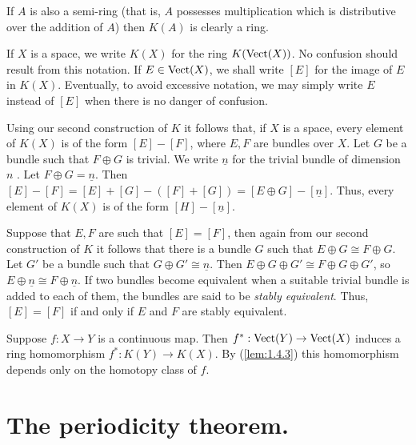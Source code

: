 If $A$ is also a semi-ring (that is, $A$ possesses multiplication which is distributive over the addition of $A$) then $K(A)$ is clearly a ring. \par \hfill

If $X$ is a space, we write $K(X)$ for the ring $K(\operatorname{Vect}(X))$. No confusion should result from this notation. If $E \in \operatorname{Vect}(X)$, we shall write $[E]$ for the image of $E$ in $K(X)$. Eventually, to avoid excessive notation, we may simply write $E$ instead of $[E]$ when there is no danger of confusion. \par 

Using our second construction of $K$ it follows that, if $X$ is a space, every element of $K(X)$ is of the form $[E] - [F]$, where $E, F$ are bundles over $X$. Let $G$ be a bundle such that $F \oplus G$ is trivial. We write $\underline{n}$ for the trivial bundle of dimension $n$ . Let $F \oplus G = \underline{n}$. Then $[E] - [F] = [E] + [G] - ([F] + [G]) = [E \oplus G] - [\underline{n}]$. Thus, every element of $K(X)$ is of the form $[H] -  [\underline{n}]$. \par 

Suppose that $E, F$ are such that $[E] = [F]$, then again from our second construction of $K$ it follows that there is a bundle $G$ such that $E \oplus G \cong F \oplus G$. Let $G'$ be a bundle such that $G \oplus G' \cong \underline{n}$. Then $E \oplus G \oplus G' \cong F \oplus G \oplus G'$, so $E \oplus \underline{n} \cong F \oplus \underline{n}$. If two bundles become equivalent when a suitable trivial bundle is added to each of them, the bundles are said to be \textit{stably equivalent}. Thus, $[E] = [F]$ if and only if $E$ and $F$ are stably equivalent. \par 

Suppose $f: X \to Y$ is a continuous map. Then $f^*: \operatorname{Vect}(Y) \to \operatorname{Vect}(X)$ induces a ring homomorphism $f^*: K(Y) \to K(X)$. By (\ref{lem:1.4.3}) this homomorphism depends only on the homotopy class of $f$. \newpage


\section{The periodicity theorem.}\label{sec:2.2}
